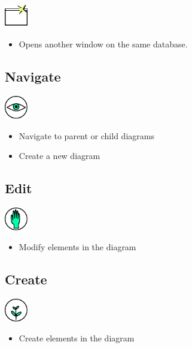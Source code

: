 \includegraphics[width=1cm]{../../gui/source/resources/file_new_window.pdf}
\begin{itemize}
\item Opens another window on the same database.
\end{itemize}

\subsection{Navigate}

\includegraphics[width=1cm]{../../gui/source/resources/tool_navigate.pdf}
\begin{itemize}
\item Navigate to parent or child diagrams
\item Create a new diagram
\end{itemize}

\subsection{Edit}

\includegraphics[width=1cm]{../../gui/source/resources/tool_edit.pdf}
\begin{itemize}
\item Modify elements in the diagram
\end{itemize}

\subsection{Create}

\includegraphics[width=1cm]{../../gui/source/resources/tool_create.pdf}
\begin{itemize}
\item Create elements in the diagram
\end{itemize}


